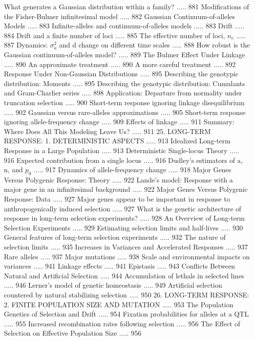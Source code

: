 \documentclass{article}
\begin{document}
What generates a Gaussian distribution within a family? ..... 881
Modifications of the Fisher-Bulmer infinitesimal model ..... 882
Gaussian Continuum-of-alleles Models ..... 883
Infinite-alleles and continuum-of-alleles models ..... 883
Drift ..... 884
Drift and a finite number of loci ..... 885
The effective number of loci,  $ n_{e} $ ..... 887
Dynamics:  $ \sigma_{a}^{2} $ and d change on different time scales ..... 888
How robust is the Gaussian continuum-of-alleles model? ..... 889
The Bulmer Effect Under Linkage ..... 890
An approximate treatment ..... 890
A more careful treatment ..... 892
Response Under Non-Gaussian Distributions ..... 895
Describing the genotypic distribution: Moments ..... 895
Describing the genotypic distribution: Cumulants and Gram-Charlier series ..... 898
Application: Departure from normality under truncation selection ..... 900
Short-term response ignoring linkage disequilibrium ..... 902
Gaussian versus rare-alleles approximations ..... 905
Short-term response ignoring allele-frequency change ..... 909
Effects of linkage ..... 911
Summary: Where Does All This Modeling Leave Us? ..... 911
25. LONG-TERM RESPONSE:
1. DETERMINISTIC ASPECTS ..... 913
Idealized Long-term Response in a Large Population ..... 913
Deterministic Single-locus Theory ..... 916
Expected contribution from a single locus ..... 916
Dudley's estimators of a, n, and  $ p_{0} $ ..... 917
Dynamics of allele-frequency change ..... 918
Major Genes Versus Polygenic Response: Theory ..... 922
Lande's model: Response with a major gene in an infinitesimal background ..... 922
Major Genes Versus Polygenic Response: Data ..... 927
Major genes appear to be important in response to anthropogenically induced selection ..... 927
What is the genetic architecture of response in long-term selection experiments? ..... 928
An Overview of Long-term Selection Experiments ..... 929
Estimating selection limits and half-lives ..... 930
General features of long-term selection experiments ..... 932
The nature of selection limits ..... 935
Increases in Variances and Accelerated Responses ..... 937
Rare alleles ..... 937
Major mutations ..... 938
Scale and environmental impacts on variances ..... 941
Linkage effects ..... 941
Epistasis ..... 943
Conflicts Between Natural and Artificial Selection ..... 944
Accumulation of lethals in selected lines ..... 946
Lerner's model of genetic homeostasis ..... 949
Artificial selection countered by natural stabilizing selection ..... 950
26. LONG-TERM RESPONSE:
2. FINITE POPULATION SIZE AND MUTATION ..... 953
The Population Genetics of Selection and Drift ..... 954
Fixation probabilities for alleles at a QTL ..... 955
Increased recombination rates following selection ..... 956
The Effect of Selection on Effective Population Size ..... 956
\end{document}
